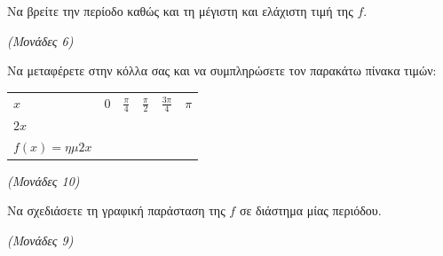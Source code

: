 \documentclass[11pt,a4paper,twoside]{book}
\newcommand{\monades}[1]{\hfill \textit{(Μονάδες #1)}}
\begin{document}
\begin{alist}
\item Να βρείτε την περίοδο καθώς και τη μέγιστη και ελάχιστη τιμή της $f$.

\monades{6}

\item

\begin{rlist}
\item Να μεταφέρετε στην κόλλα σας και να συμπληρώσετε τον παρακάτω πίνακα τιμών:

\begin{longtable}[]{@{}
  >{\centering\arraybackslash}p{}
  >{\centering\arraybackslash}p{}
  >{\centering\arraybackslash}p{}
  >{\centering\arraybackslash}p{}
  >{\centering\arraybackslash}p{}
  >{\centering\arraybackslash}p{}@{}}
\noalign{}
\begin{minipage}[b]{\linewidth}\centering
$x$
\end{minipage} & \begin{minipage}[b]{\linewidth}\centering
$0$
\end{minipage} & \begin{minipage}[b]{\linewidth}\centering
$\frac{\pi}{4}$
\end{minipage} & \begin{minipage}[b]{\linewidth}\centering
$\frac{\pi}{2}$
\end{minipage} & \begin{minipage}[b]{\linewidth}\centering
$\frac{3\pi}{4}$
\end{minipage} & \begin{minipage}[b]{\linewidth}\centering
$\pi$
\end{minipage} \\
\noalign{}

\noalign{}
\endlastfoot
$2x$ & & & & & \\
$f(x) = \eta\mu 2x$ & & & & & \\
\end{longtable}

\monades{10}

\item Να σχεδιάσετε τη γραφική παράσταση της $f$ σε διάστημα μίας περιόδου.

\monades{9}
\end{rlist}
\end{alist}
\end{document}
